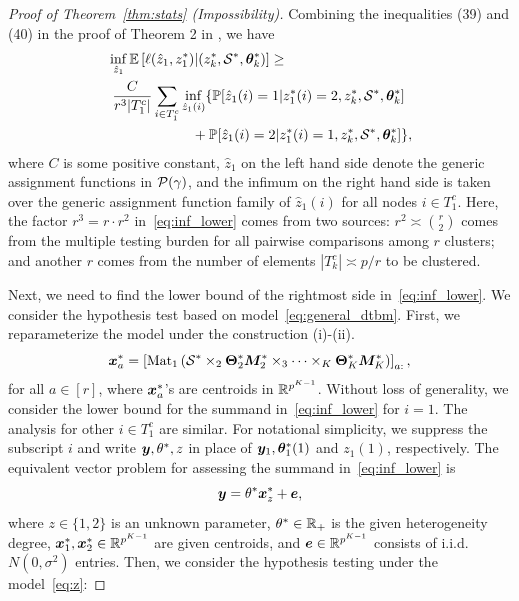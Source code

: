 \documentclass[journal]{IEEEtran}
\theoremstyle{definition}
\theoremstyle{definition}
\newcommand{\of}[1]{\left(#1\right)}
\newcommand{\off}[1]{\left[#1\right]}
\begin{document}
\begin{proof}[Proof of Theorem~\ref{thm:stats} (Impossibility)]
   Combining the inequalities (39) and (40) in the proof of Theorem 2 in \cite{gao2018community}, we have 
   \begin{align}
        & \inf_{\hat z_1 } \bbE \left[ \ell(\hat z_1, z_1^*) | (z^*_k, \tS^*, \mtheta^*_k)  \right] \geq  \\
        & \  \frac{C}{r^3 |T_1^c|} \sum_{i \in T_1^c} \inf_{\hat z_1  (i)} \{ \bbP[\hat z_1(i) = 1| z_1^*(i) = 2,z^*_k, \tS^*, \mtheta^*_k] \\
        & \quad \quad \quad  \quad  \quad \quad +   \bbP[\hat z_1(i) = 2| z_1^*(i) = 1, z^*_k, \tS^*, \mtheta^*_k] \},\label{eq:inf_lower}
   \end{align}
   where $C$ is some positive constant,  $\hat z_1$ on the left hand side denote the generic assignment functions in $\mathcal{P}(\gamma)$, and the infimum on the right hand side is taken over the generic assignment function family of $\hat z_1(i)$ for all nodes $i \in T_1^c$. Here, the factor $r^3=r\cdot r^2$ in~\eqref{eq:inf_lower} comes from two sources: $r^2\asymp {r\choose 2}$ comes from the multiple testing burden for all pairwise comparisons among $r$ clusters; and another $r$ comes from the number of elements $|T^c_k|\asymp p/r$ to be clustered. 
   
   Next, we need to find the lower bound of the rightmost side in~\eqref{eq:inf_lower}. 
We consider the hypothesis test based on model~\eqref{eq:general_dtbm}. First, we reparameterize the model under the construction (i)-(ii).
\begin{equation}
    \mx_a^* = \off{\mat_1 \of{ \tS^*\times_2 \mTheta_2^* \mM_2^*\times_3\cdots \times_K \mTheta^*_K \mM_K^* }}_{a:},
\end{equation}
for all $a \in [r]$, where $\bm x_a^*$'s are centroids in $\mathbb{R}^{p^{K-1}}$. Without loss of generality, we consider the lower bound for the summand in~\eqref{eq:inf_lower} for $i=1$. The analysis for other $i\in T^c_1$ are similar. For notational simplicity, we suppress the subscript $i$ and write $\bm{y}, \theta^*, z$ in place of $\bm{y}_1, \boldsymbol{\theta}_1^*(1)$ and $z_1(1)$, respectively. The equivalent vector problem for assessing the summand in~\eqref{eq:inf_lower} is
\begin{equation}\label{eq:z}
\my=\theta^* \mx_{z}^*+\me,
\end{equation}
where $z\in \{1,2\}$ is an unknown parameter, $\theta^* \in \mathbb{R}_+$ is the given heterogeneity degree, $\bm x_1^*,\bm x_2^*\in\mathbb{R}^{p^{K-1}}$ are given centroids, and $\bm{e}\in\mathbb{R}^{p^{K-1}}$ consists of i.i.d.\ $N(0,\sigma^2)$ entries.  Then, we consider the hypothesis testing under the model~\eqref{eq:z}:


\end{proof}
\end{document}
